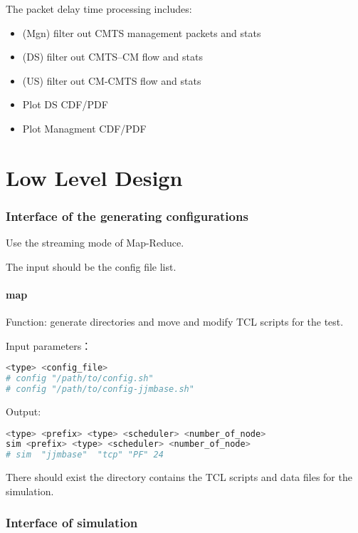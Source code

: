 The packet delay time processing includes:
\begin{itemize}
  \item (Mgn) filter out CMTS management packets and stats
  \item (DS) filter out CMTS--CM flow and stats
  \item (US) filter out CM-CMTS flow and stats
  \item Plot DS CDF/PDF
  \item Plot Managment CDF/PDF
\end{itemize}


\chapter{Low Level Design}


\subsection{Interface of the generating configurations}

Use the streaming mode of Map-Reduce.

The input should be the config file list.


\subsubsection{map}
Function: generate directories and move and modify TCL scripts for the test.


Input parameters：
\begin{lstlisting}[language=bash]
<type> <config_file>
# config "/path/to/config.sh"
# config "/path/to/config-jjmbase.sh"
\end{lstlisting}


Output:
\begin{lstlisting}[language=bash]
<type> <prefix> <type> <scheduler> <number_of_node>
sim <prefix> <type> <scheduler> <number_of_node>
# sim  "jjmbase"  "tcp" "PF" 24
\end{lstlisting}

There should exist the directory contains the TCL scripts and data files for the simulation.





\subsection{Interface of simulation}

